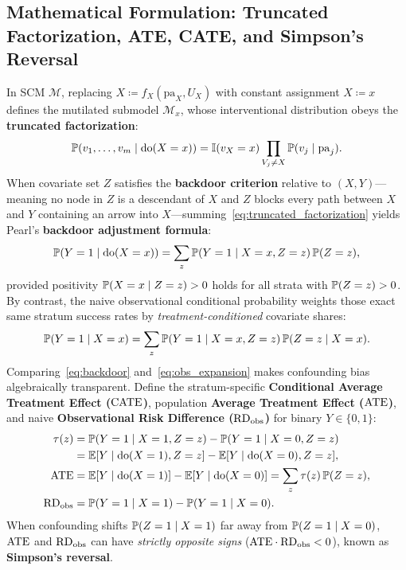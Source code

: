 \subsection{Mathematical Formulation: Truncated Factorization, ATE, CATE, and Simpson's Reversal}
In SCM $\mathcal{M}$, replacing $X \coloneqq f_X(\mathrm{pa}_X, U_X)$ with constant assignment $X \coloneqq x$ defines the mutilated submodel $\mathcal{M}_x$, whose interventional distribution obeys the \textbf{truncated factorization}:
\begin{equation}
  \mathbb{P}(v_1,\dots,v_m \mid \operatorname{do}(X=x)) = \mathbb{I}(v_X = x) \prod_{V_j \neq X} \mathbb{P}(v_j \mid \mathrm{pa}_j).
  \label{eq:truncated_factorization}
\end{equation}
When covariate set $Z$ satisfies the \textbf{backdoor criterion} relative to $(X,Y)$---meaning no node in $Z$ is a descendant of $X$ and $Z$ blocks every path between $X$ and $Y$ containing an arrow into $X$---summing~\eqref{eq:truncated_factorization} yields Pearl's \textbf{backdoor adjustment formula}:
\begin{equation}
  \mathbb{P}(Y=1 \mid \operatorname{do}(X=x)) = \sum_{z} \mathbb{P}(Y=1 \mid X=x, Z=z)\,\mathbb{P}(Z=z),
  \label{eq:backdoor}
\end{equation}
provided positivity $\mathbb{P}(X=x\mid Z=z) > 0$ holds for all strata with $\mathbb{P}(Z=z)>0$. By contrast, the naive observational conditional probability weights those exact same stratum success rates by \emph{treatment-conditioned} covariate shares:
\begin{equation}
  \mathbb{P}(Y=1 \mid X=x) = \sum_{z} \mathbb{P}(Y=1 \mid X=x, Z=z)\,\mathbb{P}(Z=z \mid X=x).
  \label{eq:obs_expansion}
\end{equation}
Comparing~\eqref{eq:backdoor} and~\eqref{eq:obs_expansion} makes confounding bias algebraically transparent. Define the stratum-specific \textbf{Conditional Average Treatment Effect ($\mathrm{CATE}$)}, population \textbf{Average Treatment Effect ($\mathrm{ATE}$)}, and naive \textbf{Observational Risk Difference ($\mathrm{RD}_{\mathrm{obs}}$)} for binary $Y \in \{0,1\}$:
\begin{align}
  \tau(z) &= \mathbb{P}(Y=1\mid X=1,Z=z) - \mathbb{P}(Y=1\mid X=0,Z=z) \nonumber\\
          &= \mathbb{E}[Y \mid \operatorname{do}(X=1), Z=z] - \mathbb{E}[Y \mid \operatorname{do}(X=0), Z=z], \label{eq:cate}\\
  \mathrm{ATE} &= \mathbb{E}[Y \mid \operatorname{do}(X=1)] - \mathbb{E}[Y \mid \operatorname{do}(X=0)] = \sum_{z} \tau(z)\,\mathbb{P}(Z=z), \label{eq:ate}\\
  \mathrm{RD}_{\mathrm{obs}} &= \mathbb{P}(Y=1 \mid X=1) - \mathbb{P}(Y=1 \mid X=0). \label{eq:rd_obs}
\end{align}
When confounding shifts $\mathbb{P}(Z=1\mid X=1)$ far away from $\mathbb{P}(Z=1\mid X=0)$, $\mathrm{ATE}$ and $\mathrm{RD}_{\mathrm{obs}}$ can have \emph{strictly opposite signs} ($\mathrm{ATE} \cdot \mathrm{RD}_{\mathrm{obs}} < 0$), known as \textbf{Simpson's reversal}.

